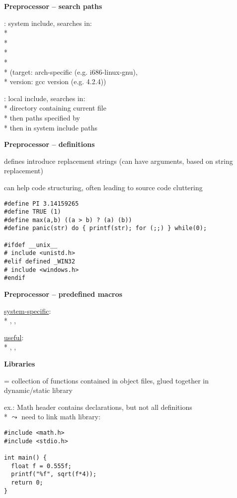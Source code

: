 \textbf{Preprocessor -- search paths}
\begin{items}
  \item {}: system include, searches in: \\*
     \\*
     \\*
     \\*
     \\*
    (target: arch-specific (e.g. i686-linux-gnu), \\*
    \phantom{x} version: gcc version (e.g. 4.2.4))
  \item {}: local include, searches in: \\*
    directory containing current file \\*
    then paths specified by  \\*
    then in system include paths
\end{items}

\textbf{Preprocessor -- definitions}
\begin{items}
  \item defines introduce replacement strings (can have arguments, based on string replacement)
  \item can help code structuring, often leading to source code cluttering
\end{items}
\begin{lstlisting}[style=customc]
#define PI 3.14159265
#define TRUE (1)
#define max(a,b) ((a > b) ? (a) (b))
#define panic(str) do { printf(str); for (;;) } while(0);

#ifdef __unix__
# include <unistd.h>
#elif defined _WIN32
# include <windows.h>
#endif
\end{lstlisting}

\textbf{Preprocessor -- predefined macros}
\begin{items}
  \item \underline{system-specific}: \\*
    , , 
  \item \underline{useful}: \\*
    , , 
\end{items}

\textbf{Libraries}
\begin{items}
  \item = collection of functions contained in object files, glued together in dynamic/static library
  \item ex.: Math header contains declarations, but not all definitions \\*
    \( \leadsto \) need to link math library: 
\end{items}
\begin{lstlisting}[style=customc]
#include <math.h>
#include <stdio.h>

int main() {
  float f = 0.555f;
  printf("%f", sqrt(f*4));
  return 0;
}
\end{lstlisting}